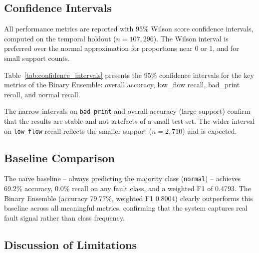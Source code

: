 \subsection{Confidence Intervals}

All performance metrics are reported with 95\% Wilson score confidence intervals, computed
on the temporal holdout ($n = 107{,}296$). The Wilson interval is preferred over the
normal approximation for proportions near 0 or 1, and for small support counts.

Table~\ref{tab:confidence_intervals} presents the 95\% confidence intervals for the key
metrics of the Binary Ensemble: overall accuracy, low\_flow recall, bad\_print recall,
and normal recall.

\begin{table}[H]
\centering
\caption{Binary Ensemble -- 95\% confidence intervals (Wilson score, temporal holdout)}
\label{tab:confidence_intervals}

\end{table}

The narrow intervals on \texttt{bad\_print} and overall accuracy (large support) confirm
that the results are stable and not artefacts of a small test set. The wider interval on
\texttt{low\_flow} recall reflects the smaller support ($n = 2{,}710$) and is expected.

\subsection{Baseline Comparison}

The na\"{i}ve baseline -- always predicting the majority class (\texttt{normal}) -- achieves
69.2\% accuracy, 0.0\% recall on any fault class, and a weighted F1 of 0.4793. The Binary
Ensemble (accuracy 79.77\%, weighted F1 0.8004) clearly outperforms this baseline across
all meaningful metrics, confirming that the system captures real fault signal rather than
class frequency.

\subsection{Discussion of Limitations}

